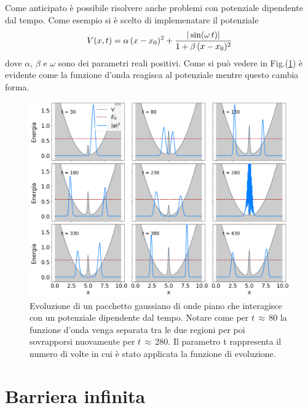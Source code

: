 \documentclass[12pt]{report}
\begin{document}
Come anticipato è possibile risolvere anche problemi con potenziale dipendente dal tempo.
Come esempio si è scelto di implemenatare il potenziale 
\begin{equation}
   \centering
   V(x, t) = \alpha \, (x-x_0)^2 +  \frac{| \sin (\omega  \, t) |} {1 + \beta \, (x-x_0)^2}
\end{equation}
dove $\alpha$, $\beta$ e $\omega$ sono dei parametri reali positivi.
Come si può vedere in Fig.(\ref{fig:t-dep}) è evidente come la funzione d'onda reagisca al potenziale mentre questo cambia forma.

\begin{figure}
   \centering
    \includegraphics[width = \textwidth]{immagini/t-dep.png}
    \caption{ \textcolor{dark-gray}{Evoluzione di un pacchetto gaussiano di onde piano che interagisce con un potenziale dipendente dal tempo. Notare come per $t \, \approx \, 80$ la funzione d'onda venga separata tra le due regioni per poi sovrapporsi nuovamente per  $t \, \approx \, 280$. Il parametro t rappresenta il numero di volte in cui è stato applicata la funzione di evoluzione. }}
    \label{fig:t-dep}
\end{figure}

\chapter{Barriera infinita}
\label{ch:inf}
\end{document}
